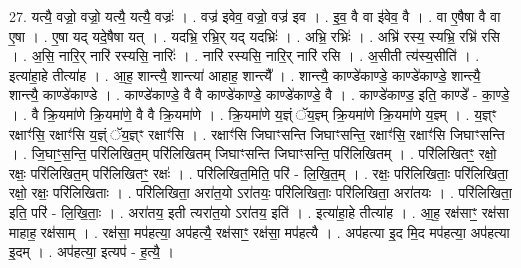 \documentclass[17pt]{extarticle}
\begin{document}
27. यत्यै॒ वज्रो॒ वज्रो॒ यत्यै॒ यत्यै॒ वज्रः॑ । . वज्र॑ इवेव॒ वज्रो॒ वज्र॑ इव । . इ॒व॒ वै वा इ॑वेव॒ वै । . वा ए॒षैषा वै वा ए॒षा । . ए॒षा यद् यदे॒षैषा यत् । . यदभ्रि॒ रभ्रि॒र् यद् यदभ्रिः॑ । . अभ्रि॒ रभ्रिः॑ । . अभ्रि॑ रस्य॒ स्यभ्रि॒ रभ्रि॑ रसि । . अ॒सि॒ नारि॒र् नारि॑ रस्यसि॒ नारिः॑ । . नारि॑ रस्यसि॒ नारि॒र् नारि॑ रसि । . अ॒सीती त्य॑स्य॒सीति॑ । . इत्या॑हा॒हे तीत्या॑ह । . आ॒ह॒ शान्त्यै॒ शान्त्या॑ आहाह॒ शान्त्यै᳚ । . शान्त्यै॒ काण्डे॑काण्डे॒ काण्डे॑काण्डे॒ शान्त्यै॒ शान्त्यै॒ काण्डे॑काण्डे । . काण्डे॑काण्डे॒ वै वै काण्डे॑काण्डे॒ काण्डे॑काण्डे॒ वै । . काण्डे॑काण्ड॒ इति॒ काण्डे᳚ - का॒ण्डे॒ । . वै क्रि॒यमा॑णे क्रि॒यमा॑णे॒ वै वै क्रि॒यमा॑णे । . क्रि॒यमा॑णे य॒ज्ञ्ं ॅय॒ज्ञ्म् क्रि॒यमा॑णे क्रि॒यमा॑णे य॒ज्ञ्म् । . य॒ज्ञ्ꣳ रक्षाꣳ॑सि॒ रक्षाꣳ॑सि य॒ज्ञ्ं ॅय॒ज्ञ्ꣳ रक्षाꣳ॑सि । . रक्षाꣳ॑सि जिघाꣳसन्ति जिघाꣳसन्ति॒ रक्षाꣳ॑सि॒ रक्षाꣳ॑सि जिघाꣳसन्ति । . जि॒घाꣳ॒॒स॒न्ति॒ परि॑लिखित॒म् परि॑लिखितम् जिघाꣳसन्ति जिघाꣳसन्ति॒ परि॑लिखितम् । . परि॑लिखितꣳ॒॒ रक्षो॒ रक्षः॒ परि॑लिखित॒म् परि॑लिखितꣳ॒॒ रक्षः॑ । . परि॑लिखित॒मिति॒ परि॑ - लि॒खि॒त॒म् । . रक्षः॒ परि॑लिखिताः॒ परि॑लिखिता॒ रक्षो॒ रक्षः॒ परि॑लिखिताः । . परि॑लिखिता॒ अरा॑त॒यो ऽरा॑तयः॒ परि॑लिखिताः॒ परि॑लिखिता॒ अरा॑तयः । . परि॑लिखिता॒ इति॒ परि॑ - लि॒खि॒ताः॒ । . अरा॑तय॒ इती त्यरा॑त॒यो ऽरा॑तय॒ इति॑ । . इत्या॑हा॒हे तीत्या॑ह । . आ॒ह॒ रक्ष॑साꣳ॒॒ रक्ष॑सा माहाह॒ रक्ष॑साम् । . रक्ष॑सा॒ मप॑हत्या॒ अप॑हत्यै॒ रक्ष॑साꣳ॒॒ रक्ष॑सा॒ मप॑हत्यै । . अप॑हत्या इ॒द मि॒द मप॑हत्या॒ अप॑हत्या इ॒दम् । . अप॑हत्या॒ इत्यप॑ - ह॒त्यै॒ । \newline
\end{document}
